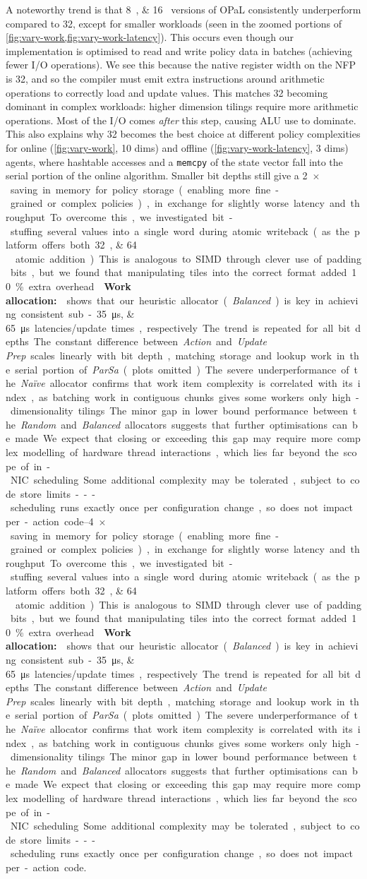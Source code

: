\documentclass[
sigconf,natbib=false
]{acmart}
\newcommand{\fakepara}[1]{\noindent\textbf{#1:}}
\newcommand{\approachshort}{OPaL}
\begin{document}
A noteworthy trend is that \SIlist{8;16}{\bit} versions of \approachshort{} consistently underperform compared to \SI{32}{\bit}, except for smaller workloads (seen in the zoomed portions of \cref{fig:vary-work,fig:vary-work-latency}).
This occurs even though our implementation is optimised to read and write policy data in batches (achieving fewer I/O operations).
We see this because the native register width on the NFP is \SI{32}{\bit}, and so the compiler must emit extra instructions around arithmetic operations to correctly load and update values.
This matches \SI{32}{\bit} becoming dominant in complex workloads: higher dimension tilings require more arithmetic operations.
Most of the I/O comes \emph{after} this step, causing ALU use to dominate.
This also explains why \SI{32}{\bit} becomes the best choice at different policy complexities for online (\cref{fig:vary-work}, 10 dims) and offline (\cref{fig:vary-work-latency}, 3 dims) agents, where hashtable accesses and a \texttt{memcpy} of the state vector fall into the serial portion of the online algorithm.
Smaller bit depths still give a \SIrange{2}{4}{$\times$} saving in memory for policy storage (enabling more fine-grained or complex policies), in exchange for slightly worse latency and throughput.
To overcome this, we investigated bit-stuffing several values into a single word during atomic writeback (as the platform offers both \SIlist{32;64
}{\bit} atomic addition).
This is analogous to SIMD through clever use of padding bits, but we found that manipulating tiles into the correct format added \SI{10}{\percent} extra overhead.

\fakepara{Work allocation}
 shows that our heuristic allocator (\emph{Balanced}) is key in achieving consistent sub-\SIlist{35;65}{\micro\second} latencies/update times, respectively.
The trend is repeated for all bit depths.
The constant difference between \emph{Action} and \emph{Update Prep} scales linearly with bit depth, matching storage and lookup work in the serial portion of \emph{ParSa} (plots omitted).
The severe underperformance of the \emph{Na\"{i}ve} allocator confirms that work item complexity is correlated with its index, as batching work in contiguous chunks gives some workers only high-dimensionality tilings.
The minor gap in lower bound performance between the \emph{Random} and \emph{Balanced} allocators suggests that further optimisations can be made.
We expect that closing or exceeding this gap may require more complex modelling of hardware thread interactions, which lies far beyond the scope of in-NIC scheduling.
Some additional complexity may be tolerated, subject to code store limits---scheduling runs exactly once per configuration change, so does not impact per-action code.
\end{document}
